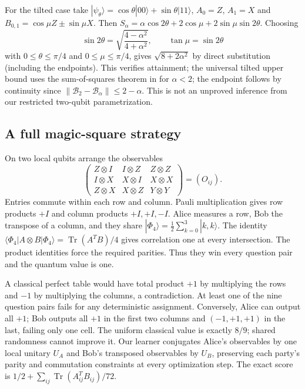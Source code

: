 \documentclass[11pt]{article}
\theoremstyle{definition}\newtheorem{definition}[theorem]{Definition}
\theoremstyle{remark}\newtheorem{remark}[theorem]{Remark}
\begin{document}
For the tilted case take
$|\psi_\theta\rangle=\cos\theta|00\rangle+\sin\theta|11\rangle$,
$A_0=Z$, $A_1=X$ and $B_{0,1}=\cos\mu Z\mathbin{\pm}\sin\mu X$.
Then $S_\alpha=\alpha\cos2\theta+2\cos\mu+
2\sin\mu\sin2\theta$. Choosing
\[
 \sin2\theta=\sqrt{\frac{4-\alpha^2}{4+\alpha^2}},\qquad
 \tan\mu=\sin2\theta
\]
with $0\le\theta\le\pi/4$ and $0\le\mu\le\pi/4$,
gives $\sqrt{8+2\alpha^2}$ by direct substitution (including the endpoints).
This verifies attainment; the universal tilted upper bound uses the
sum-of-squares theorem in \cite{GameTilted} for $\alpha<2$; the endpoint
follows by continuity since $\|\mathcal B_2-\mathcal B_\alpha\|\le2-\alpha$.
This is not an unproved inference from
our restricted two-qubit parametrization.

\subsection{A full magic-square strategy}
On two local qubits arrange the observables
\[
 \begin{pmatrix}
 Z\otimes I&I\otimes Z&Z\otimes Z\\
 I\otimes X&X\otimes I&X\otimes X\\
 Z\otimes X&X\otimes Z&Y\otimes Y
 \end{pmatrix}=(O_{ij}).
\]
Entries commute within each row and column. Pauli multiplication gives row
products $+I$ and column products $+I,+I,-I$. Alice measures a row, Bob the
transpose of a column, and they share
$|\Phi_4\rangle=\frac12\sum_{k=0}^3|k,k\rangle$.
The identity $\langle\Phi_4|A\otimes B|\Phi_4\rangle=
\operatorname{Tr}(A^TB)/4$ gives correlation one at every intersection.
The product identities force the required parities. Thus they win every
question pair and the quantum value is one.

A classical perfect table would have total product $+1$ by multiplying the
rows and $-1$ by multiplying the columns, a contradiction. At least one of
the nine question pairs fails for any deterministic assignment. Conversely,
Alice can output all $+1$; Bob outputs all $+1$ in the first two columns and
$(-1,+1,+1)$ in the last, failing only one cell. The uniform classical value
is exactly $8/9$; shared randomness cannot improve it.
Our learner conjugates Alice's observables by one local unitary $U_A$ and
Bob's transposed observables by $U_B$, preserving each party's parity and
commutation constraints at every optimization step. The exact score is
$1/2+\sum_{ij}\operatorname{Tr}(A_{ij}^TB_{ij})/72$.
\end{document}
